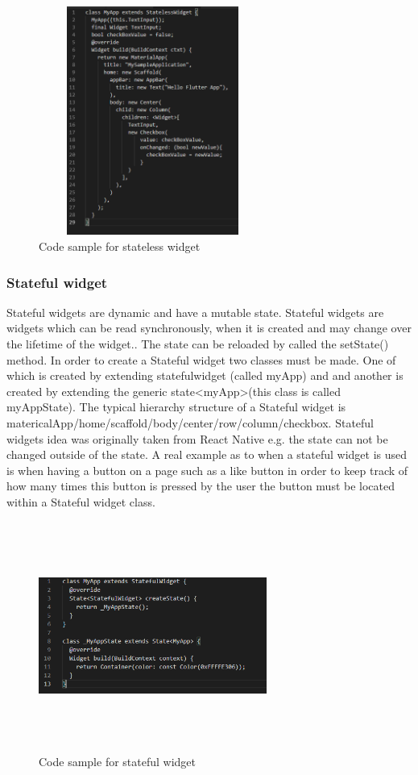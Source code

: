 \begin{figure}[ht!]
    \centering
 \includegraphics[width=75mm, height=75mm,scale=0.5]{img/stateless.PNG}
\caption{Code sample for stateless widget}
\label{fig:stateless}
\end{figure}

\subsubsection{Stateful widget}
Stateful widgets are dynamic and have a mutable state. Stateful widgets are widgets which can be read synchronously, when it is created and may change over the lifetime of the widget.\cite{stateful_widgets_2018}. The state can be reloaded by called the setState() method. In order to create a Stateful widget two classes must be made. One of which is created by extending statefulwidget (called myApp) and and another is created by extending the generic state<myApp>(this class is called myAppState). The typical hierarchy structure of a Stateful widget is matericalApp/home/scaffold/body/center/row/column/checkbox.\cite{widgets} \cite{stateful} Stateful widgets idea was originally taken from React Native e.g. the state can not  be changed outside of the state. A real example as to when a stateful widget is used is when having a button on a page such as a like button in order to keep track of how many times this button is pressed by the user the button must be located within a Stateful widget class. \cite{choudhary_2019}


\begin{figure}[ht!]
    \centering
 \includegraphics[width=75mm, height=75mm,scale=0.5]{img/stateful.PNG}
\caption{Code sample for stateful widget}
\label{fig:stateful}
\end{figure}

